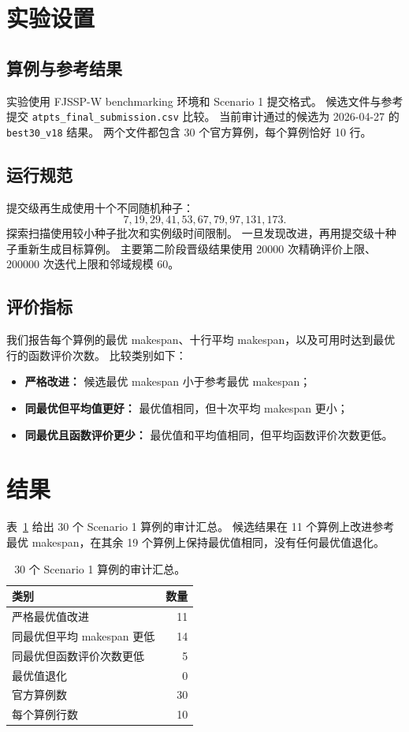 \documentclass[UTF8,a4paper,zihao=-4]{ctexart}
\begin{document}
\section{实验设置}
\subsection{算例与参考结果}
实验使用 FJSSP-W benchmarking 环境和 Scenario 1 提交格式。
候选文件与参考提交 \texttt{atpts\_final\_submission.csv} 比较。
当前审计通过的候选为 2026-04-27 的 \texttt{best30\_v18} 结果。
两个文件都包含 30 个官方算例，每个算例恰好 10 行。

\subsection{运行规范}
提交级再生成使用十个不同随机种子：
\[
7,19,29,41,53,67,79,97,131,173.
\]
探索扫描使用较小种子批次和实例级时间限制。
一旦发现改进，再用提交级十种子重新生成目标算例。
主要第二阶段晋级结果使用 20000 次精确评价上限、200000 次迭代上限和邻域规模 60。

\subsection{评价指标}
我们报告每个算例的最优 makespan、十行平均 makespan，以及可用时达到最优行的函数评价次数。
比较类别如下：
\begin{itemize}
  \item \textbf{严格改进：} 候选最优 makespan 小于参考最优 makespan；
  \item \textbf{同最优但平均值更好：} 最优值相同，但十次平均 makespan 更小；
  \item \textbf{同最优且函数评价更少：} 最优值和平均值相同，但平均函数评价次数更低。
\end{itemize}

\section{结果}
表~\ref{tab:summary-zh} 给出 30 个 Scenario 1 算例的审计汇总。
候选结果在 11 个算例上改进参考最优 makespan，在其余 19 个算例上保持最优值相同，没有任何最优值退化。

\begin{table}[t]
  \centering
  \caption{30 个 Scenario 1 算例的审计汇总。}
  \label{tab:summary-zh}
  \begin{tabular}{lr}
    \toprule
    类别 & 数量 \\
    \midrule
    严格最优值改进 & 11 \\
    同最优但平均 makespan 更低 & 14 \\
    同最优但函数评价次数更低 & 5 \\
    最优值退化 & 0 \\
    \midrule
    官方算例数 & 30 \\
    每个算例行数 & 10 \\
    \bottomrule
  \end{tabular}
\end{table}
\end{document}
